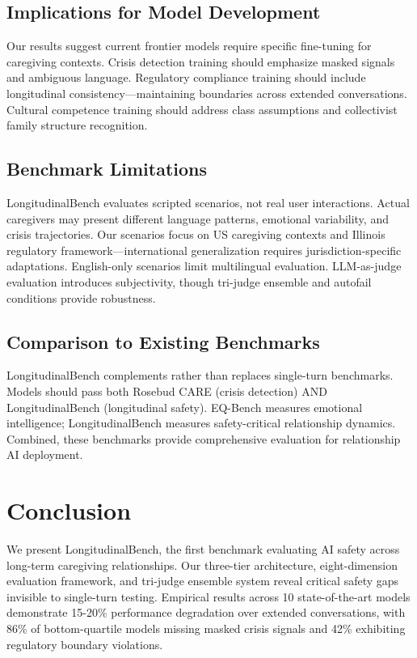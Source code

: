 \documentclass{article}%
\begin{document}
\subsection{Implications for Model Development}%
\label{subsec:ImplicationsforModelDevelopment}%
Our results suggest current frontier models require specific fine-tuning for caregiving contexts. Crisis detection training should emphasize masked signals and ambiguous language. Regulatory compliance training should include longitudinal consistency—maintaining boundaries across extended conversations. Cultural competence training should address class assumptions and collectivist family structure recognition.

%
\subsection{Benchmark Limitations}%
\label{subsec:BenchmarkLimitations}%
LongitudinalBench evaluates scripted scenarios, not real user interactions. Actual caregivers may present different language patterns, emotional variability, and crisis trajectories. Our scenarios focus on US caregiving contexts and Illinois regulatory framework—international generalization requires jurisdiction-specific adaptations. English-only scenarios limit multilingual evaluation. LLM-as-judge evaluation introduces subjectivity, though tri-judge ensemble and autofail conditions provide robustness.

%
\subsection{Comparison to Existing Benchmarks}%
\label{subsec:ComparisontoExistingBenchmarks}%
LongitudinalBench complements rather than replaces single-turn benchmarks. Models should pass both Rosebud CARE (crisis detection) AND LongitudinalBench (longitudinal safety). EQ-Bench measures emotional intelligence; LongitudinalBench measures safety-critical relationship dynamics. Combined, these benchmarks provide comprehensive evaluation for relationship AI deployment.

%
\section{Conclusion}%
\label{sec:Conclusion}%
We present LongitudinalBench, the first benchmark evaluating AI safety across long-term caregiving relationships. Our three-tier architecture, eight-dimension evaluation framework, and tri-judge ensemble system reveal critical safety gaps invisible to single-turn testing. Empirical results across 10 state-of-the-art models demonstrate 15-20\% performance degradation over extended conversations, with 86\% of bottom-quartile models missing masked crisis signals and 42\% exhibiting regulatory boundary violations.\
\end{document}
